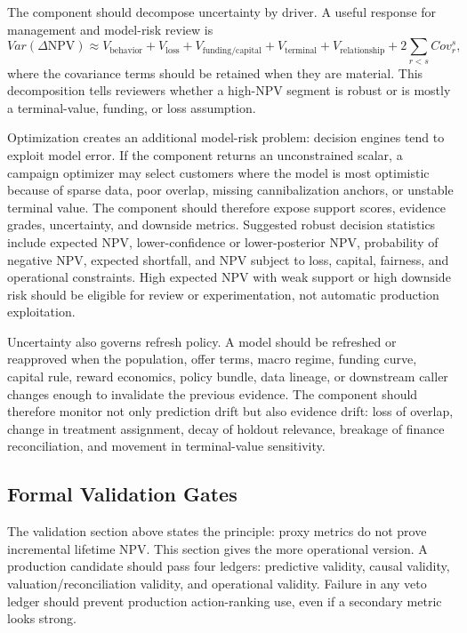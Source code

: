 \documentclass[11pt]{article}
\newcommand{\NPV}{\mathrm{NPV}}
\newcommand{\1}{\mathbf{1}}
\begin{document}
The component should decompose uncertainty by driver. A useful response for
management and model-risk review is
\[
  Var(\Delta \NPV)
  \approx
  V_{\mathrm{behavior}}
  +V_{\mathrm{loss}}
  +V_{\mathrm{funding/capital}}
  +V_{\mathrm{terminal}}
  +V_{\mathrm{relationship}}
  +2\sum_{r<s}Cov_r^s,
\]
where the covariance terms should be retained when they are material. This
decomposition tells reviewers whether a high-NPV segment is robust or is
mostly a terminal-value, funding, or loss assumption.

Optimization creates an additional model-risk problem: decision engines tend
to exploit model error. If the component returns an unconstrained scalar, a
campaign optimizer may select customers where the model is most optimistic
because of sparse data, poor overlap, missing cannibalization anchors, or
unstable terminal value. The component should therefore expose support scores,
evidence grades, uncertainty, and downside metrics. Suggested robust decision
statistics include expected NPV, lower-confidence or lower-posterior NPV,
probability of negative NPV, expected shortfall, and NPV subject to loss,
capital, fairness, and operational constraints. High expected NPV with weak
support or high downside risk should be eligible for review or experimentation,
not automatic production exploitation.

Uncertainty also governs refresh policy. A model should be refreshed or
reapproved when the population, offer terms, macro regime, funding curve,
capital rule, reward economics, policy bundle, data lineage, or downstream
caller changes enough to invalidate the previous evidence. The component
should therefore monitor not only prediction drift but also evidence drift:
loss of overlap, change in treatment assignment, decay of holdout relevance,
breakage of finance reconciliation, and movement in terminal-value
sensitivity.

\subsection{Formal Validation Gates}
\label{sec:validation-gates-formal}

The validation section above states the principle: proxy metrics do not prove
incremental lifetime NPV. This section gives the more operational version. A
production candidate should pass four ledgers: predictive validity, causal
validity, valuation/reconciliation validity, and operational validity. Failure
in any veto ledger should prevent production action-ranking use, even if a
secondary metric looks strong.
\end{document}
